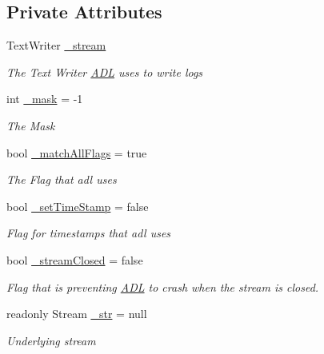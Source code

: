 \subsection*{Private Attributes}
\begin{DoxyCompactItemize}
\item 
Text\+Writer \mbox{\hyperlink{class_a_d_l_1_1_log_stream_a9655793b8d2cace20afc1242f6d431e0}{\+\_\+stream}}
\begin{DoxyCompactList}\small\item\em The Text Writer \mbox{\hyperlink{namespace_a_d_l}{A\+DL}} uses to write logs \end{DoxyCompactList}\item 
int \mbox{\hyperlink{class_a_d_l_1_1_log_stream_a3d8bed5f5dbdebc350a831ea9eca999d}{\+\_\+mask}} = -\/1
\begin{DoxyCompactList}\small\item\em The Mask \end{DoxyCompactList}\item 
bool \mbox{\hyperlink{class_a_d_l_1_1_log_stream_a93dd10abf1a54aa066e94bb2c675da36}{\+\_\+match\+All\+Flags}} = true
\begin{DoxyCompactList}\small\item\em The Flag that adl uses \end{DoxyCompactList}\item 
bool \mbox{\hyperlink{class_a_d_l_1_1_log_stream_ac5385a0fa83955ccf5debf4a3e4f5b4c}{\+\_\+set\+Time\+Stamp}} = false
\begin{DoxyCompactList}\small\item\em Flag for timestamps that adl uses \end{DoxyCompactList}\item 
bool \mbox{\hyperlink{class_a_d_l_1_1_log_stream_a753bb1ba574078533b1a020a44800ccb}{\+\_\+stream\+Closed}} = false
\begin{DoxyCompactList}\small\item\em Flag that is preventing \mbox{\hyperlink{namespace_a_d_l}{A\+DL}} to crash when the stream is closed. \end{DoxyCompactList}\item 
readonly Stream \mbox{\hyperlink{class_a_d_l_1_1_log_stream_a005371df709890708a1bc2cdac48fa0d}{\+\_\+str}} = null
\begin{DoxyCompactList}\small\item\em Underlying stream \end{DoxyCompactList}\end{DoxyCompactItemize}


